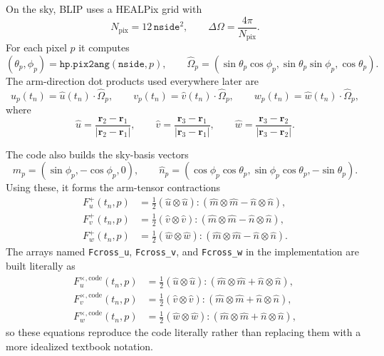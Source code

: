 \documentclass[11pt]{article}
\begin{document}
On the sky, BLIP uses a HEALPix grid with
\begin{equation}
N_{\mathrm{pix}}=12\,\texttt{nside}^2,
\qquad
\Delta\Omega=\frac{4\pi}{N_{\mathrm{pix}}}.
\end{equation}
For each pixel $p$ it computes
\begin{equation}
(\theta_p,\phi_p)=\texttt{hp.pix2ang}(\texttt{nside},p),
\qquad
\hat{\Omega}_p=
(\sin\theta_p\cos\phi_p,\sin\theta_p\sin\phi_p,\cos\theta_p).
\end{equation}
The arm-direction dot products used everywhere later are
\begin{equation}
u_p(t_n)=\hat{u}(t_n)\cdot\hat{\Omega}_p,
\qquad
v_p(t_n)=\hat{v}(t_n)\cdot\hat{\Omega}_p,
\qquad
w_p(t_n)=\hat{w}(t_n)\cdot\hat{\Omega}_p,
\end{equation}
where
\begin{equation}
\hat{u}=\frac{\mathbf{r}_2-\mathbf{r}_1}{|\mathbf{r}_2-\mathbf{r}_1|},
\qquad
\hat{v}=\frac{\mathbf{r}_3-\mathbf{r}_1}{|\mathbf{r}_3-\mathbf{r}_1|},
\qquad
\hat{w}=\frac{\mathbf{r}_3-\mathbf{r}_2}{|\mathbf{r}_3-\mathbf{r}_2|}.
\end{equation}

The code also builds the sky-basis vectors
\begin{equation}
\hat{m}_p=(\sin\phi_p,-\cos\phi_p,0),
\qquad
\hat{n}_p=(\cos\phi_p\cos\theta_p,\sin\phi_p\cos\theta_p,-\sin\theta_p).
\end{equation}
Using these, it forms the arm-tensor contractions
\begin{align}
F^{+}_{u}(t_n,p) &= \frac{1}{2}\left(\hat{u}\otimes\hat{u}\right):\left(\hat{m}\otimes\hat{m}-\hat{n}\otimes\hat{n}\right), \\
F^{+}_{v}(t_n,p) &= \frac{1}{2}\left(\hat{v}\otimes\hat{v}\right):\left(\hat{m}\otimes\hat{m}-\hat{n}\otimes\hat{n}\right), \\
F^{+}_{w}(t_n,p) &= \frac{1}{2}\left(\hat{w}\otimes\hat{w}\right):\left(\hat{m}\otimes\hat{m}-\hat{n}\otimes\hat{n}\right).
\end{align}
The arrays named \texttt{Fcross\_u}, \texttt{Fcross\_v}, and \texttt{Fcross\_w} in the implementation are built literally as
\begin{align}
F^{\times,\mathrm{code}}_{u}(t_n,p) &= \frac{1}{2}\left(\hat{u}\otimes\hat{u}\right):\left(\hat{m}\otimes\hat{m}+\hat{n}\otimes\hat{n}\right), \\
F^{\times,\mathrm{code}}_{v}(t_n,p) &= \frac{1}{2}\left(\hat{v}\otimes\hat{v}\right):\left(\hat{m}\otimes\hat{m}+\hat{n}\otimes\hat{n}\right), \\
F^{\times,\mathrm{code}}_{w}(t_n,p) &= \frac{1}{2}\left(\hat{w}\otimes\hat{w}\right):\left(\hat{m}\otimes\hat{m}+\hat{n}\otimes\hat{n}\right),
\end{align}
so these equations reproduce the code literally rather than replacing them with a more idealized textbook notation.
\end{document}
